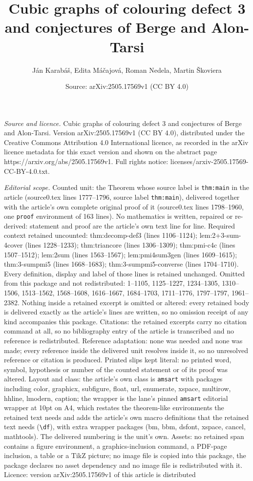 \documentclass[10pt,a4paper]{amsart}
\title[Cubic graphs of colouring defect 3 and conjectures of Berge ]{Cubic graphs of colouring defect 3 and conjectures of Berge and Alon-Tarsi}
\author{J\'an Karab\'a\v{s}, Edita M\'a\v{c}ajov\'a, Roman Nedela, Martin \v{S}koviera}
\date{Source: arXiv:2505.17569v1 (CC BY 4.0)}
\begin{document}
\maketitle

\noindent\emph{Source and licence.} Cubic graphs of colouring defect 3 and conjectures of Berge and Alon-Tarsi. Version arXiv:2505.17569v1 (CC BY 4.0), distributed under the Creative Commons Attribution 4.0 International licence, as recorded in the arXiv licence metadata for this exact version and shown on the abstract page https://arxiv.org/abs/2505.17569v1. Full rights notice: licenses/arxiv-2505.17569-CC-BY-4.0.txt.\par\smallskip

\noindent\textit{Editorial scope.} Counted unit: the Theorem whose source label is \texttt{thm:main} in the article (source0.tex lines 1777--1796, source label \texttt{thm:main}), delivered together with the article's own complete original proof of it (source0.tex lines 1798--1960, one \texttt{proof} environment of 163 lines). No mathematics is written, repaired or re-derived: statement and proof are the article's own text line for line. Required context retained uncounted: thm:decomp-def3 (lines 1106--1124); lem:2+3-sum-4cover (lines 1228--1233); thm:triancore (lines 1306--1309); thm:pmi-c4c (lines 1507--1512); lem:2sum (lines 1563--1567); lem:pmi4sum3gen (lines 1609--1615); thm:3-sumpmi5 (lines 1668--1683); thm:3-sumpmi5-converse (lines 1704--1710). Every definition, display and label of those lines is retained unchanged. Omitted from this package and not redistributed: 1--1105, 1125--1227, 1234--1305, 1310--1506, 1513--1562, 1568--1608, 1616--1667, 1684--1703, 1711--1776, 1797--1797, 1961--2382. Nothing inside a retained excerpt is omitted or altered: every retained body is delivered exactly as the article's lines are written, so no omission receipt of any kind accompanies this package. Citations: the retained excerpts carry no citation command at all, so no bibliography entry of the article is transcribed and no reference is redistributed. Reference adaptation: none was needed and none was made; every reference inside the delivered unit resolves inside it, so no unresolved reference or citation is produced. Printed slips kept literal: no printed word, symbol, hypothesis or number of the counted statement or of its proof was altered. Layout and class: the article's own class is \texttt{amsart} with packages including color, graphicx, subfigure, float, url, enumerate, xspace, multirow, hhline, lmodern, caption; the wrapper is the lane's pinned \texttt{amsart} editorial wrapper at 10pt on A4, which restates the theorem-like environments the retained text needs and adds the article's own macro definitions that the retained text needs (\texttt{\textbackslash df}), with extra wrapper packages (bm, bbm, dsfont, xspace, cancel, mathtools). The delivered numbering is the unit's own. Assets: no retained span contains a figure environment, a graphics-inclusion command, a PDF-page inclusion, a table or a TikZ picture; no image file is copied into this package, the package declares no asset dependency and no image file is redistributed with it. Licence: version arXiv:2505.17569v1 of this article is distributed 
\end{document}
